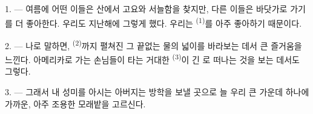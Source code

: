 %
%
%
%
%

\VUsaut{4.0mm}
\VUsaut{3.0mm}
\VUsaut{3.0mm}

1. --- 여름에 어떤 이들은 산에서 고요와 서늘함을 찾지만, 다른 이들은 바닷가로 가기를 더
좋아한다. 우리도 지난해에 그렇게 했다. 우리는  \textsuperscript{(1)}를
아주 좋아하기 때문이다.

2. --- 나로 말하면,  \textsuperscript{(2)}까지 펼쳐진 그 끝없는 물의 넓이를
바라보는 데서 큰 즐거움을 느낀다. 아메리카로 가는 손님들이 타는 거대한
 \textsuperscript{(3)}이 긴 로 떠나는 것을 보는 데서도 그렇다.

3. --- 그래서 내 성미를 아시는 아버지는 방학을 보낼 곳으로 늘 우리 큰
 가운데 하나에 가까운, 아주 조용한 모래밭을 고르신다.

